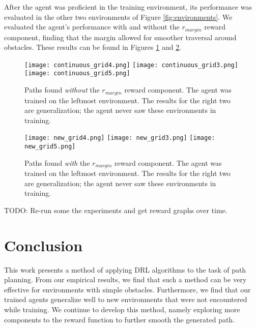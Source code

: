         After the agent was proficient in the training environment, its performance was evaluated
        in the other two environments of Figure \ref{fig:environments}. We evaluated the agent's
        performance with and without the $r_{margin}$ reward component, finding that the margin
        allowed for smoother traversal around obstacles. These results can be found in Figures
        \ref{fig:results_no_margin} and \ref{fig:results_with_margin}.

        \begin{figure}[H]
            \centering
                \texttt{[image: continuous\_grid4.png]}
                \texttt{[image: continuous\_grid3.png]}
                \texttt{[image: continuous\_grid5.png]}
                \caption{Paths found \textit{without} the $r_{margin}$ reward component. The agent was
                         trained on the leftmost environment. The results for the right two
                         are generalization; the agent never saw these environments in training.}
                \label{fig:results_no_margin}
        \end{figure}

        \begin{figure}[H]
            \centering
                \texttt{[image: new\_grid4.png]}
                \texttt{[image: new\_grid3.png]}
                \texttt{[image: new\_grid5.png]}
                \caption{Paths found \textit{with} the $r_{margin}$ reward component. The agent was
                         trained on the leftmost environment. The results for the right two
                         are generalization; the agent never saw these environments in training.}
                \label{fig:results_with_margin}
        \end{figure}

        TODO: Re-run some the experiments and get reward graphs over time.

    \section{Conclusion}
        This work presents a method of applying DRL algorithms to the task of path planning.
        From our empirical results, we find that such a method can be very effective for
        environments with simple obstacles. Furthermore, we find that our trained agents
        generalize well to new environments that were not encountered while training. We continue
        to develop this method, namely exploring more components to the reward function to further
        smooth the generated path.
